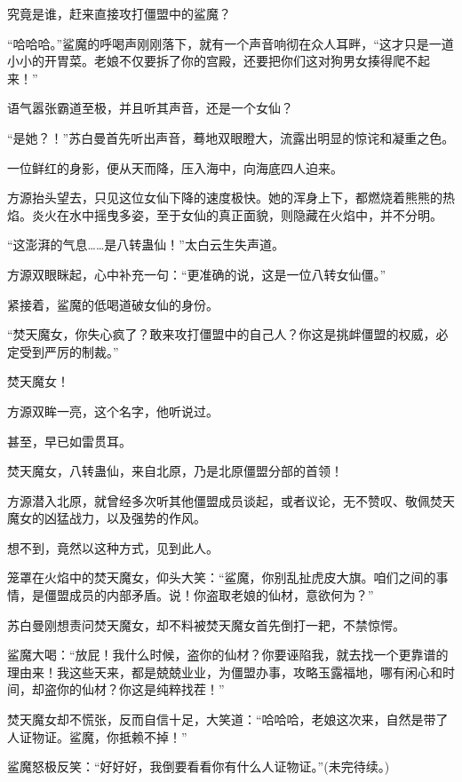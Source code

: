 \begin{this_body}
究竟是谁，赶来直接攻打僵盟中的鲨魔？

“哈哈哈。”鲨魔的呼喝声刚刚落下，就有一个声音响彻在众人耳畔，“这才只是一道小小的开胃菜。老娘不仅要拆了你的宫殿，还要把你们这对狗男女揍得爬不起来！”

语气嚣张霸道至极，并且听其声音，还是一个女仙？

“是她？！”苏白曼首先听出声音，蓦地双眼瞪大，流露出明显的惊诧和凝重之色。

一位鲜红的身影，便从天而降，压入海中，向海底四人迫来。

方源抬头望去，只见这位女仙下降的速度极快。她的浑身上下，都燃烧着熊熊的热焰。炎火在水中摇曳多姿，至于女仙的真正面貌，则隐藏在火焰中，并不分明。

“这澎湃的气息……是八转蛊仙！”太白云生失声道。

方源双眼眯起，心中补充一句：“更准确的说，这是一位八转女仙僵。”

紧接着，鲨魔的低喝道破女仙的身份。

“焚天魔女，你失心疯了？敢来攻打僵盟中的自己人？你这是挑衅僵盟的权威，必定受到严厉的制裁。”

焚天魔女！

方源双眸一亮，这个名字，他听说过。

甚至，早已如雷贯耳。

焚天魔女，八转蛊仙，来自北原，乃是北原僵盟分部的首领！

方源潜入北原，就曾经多次听其他僵盟成员谈起，或者议论，无不赞叹、敬佩焚天魔女的凶猛战力，以及强势的作风。

想不到，竟然以这种方式，见到此人。

笼罩在火焰中的焚天魔女，仰头大笑：“鲨魔，你别乱扯虎皮大旗。咱们之间的事情，是僵盟成员的内部矛盾。说！你盗取老娘的仙材，意欲何为？”

苏白曼刚想责问焚天魔女，却不料被焚天魔女首先倒打一耙，不禁惊愕。

鲨魔大喝：“放屁！我什么时候，盗你的仙材？你要诬陷我，就去找一个更靠谱的理由来！我这些天来，都是兢兢业业，为僵盟办事，攻略玉露福地，哪有闲心和时间，却盗你的仙材？你这是纯粹找茬！”

焚天魔女却不慌张，反而自信十足，大笑道：“哈哈哈，老娘这次来，自然是带了人证物证。鲨魔，你抵赖不掉！”

鲨魔怒极反笑：“好好好，我倒要看看你有什么人证物证。”(未完待续。)

\end{this_body}

